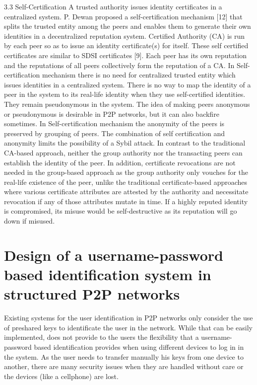  
3.3 Self-Certification
A trusted authority issues identity certificates in a
centralized system. P. Dewan proposed a self-certification
mechanism [12] that splits the trusted entity among the
peers and enables them to generate their own identities in a
decentralized reputation system. Certified Authority (CA)
is run by each peer so as to issue an identity certificate(s)
for itself. These self certified certificates are similar to
SDSI certificates [9]. Each peer has its own reputation and
the reputations of all peers collectively form the reputation
of a CA.
In Self-certification mechanism there is no need for
centralized trusted entity which issues identities in a
centralized system. There is no way to map the identity of
a peer in the system to its real-life identity when they use
self-certified identities. They remain pseudonymous in the
system. The idea of making peers anonymous or
pseudonymous is desirable in P2P networks, but it can also
backfire sometimes.
In Self-certification mechanism the anonymity of the peers
is preserved by grouping of peers. The combination of self
certification and anonymity limits the possibility of a Sybil
attack. In contrast to the traditional CA-based approach,
neither the group authority nor the transacting peers can
establish the identity of the peer. In addition, certificate
revocations are not needed in the group-based approach as
the group authority only vouches for the real-life existence
of the peer, unlike the traditional certificate-based
approaches where various certificate attributes are attested
by the authority and necessitate revocation if any of those
attributes mutate in time. If a highly reputed identity is
compromised, its misuse would be self-destructive as its
reputation will go down if misused.

\chapter{Design of a username-password based identification system in structured P2P networks}

Existing systems for the user identification in P2P networks only consider the
use of preshared keys to identificate the user in the network. While that can
be easily implemented, does not provide to the users the flexibility that a
username-password based identification provides when using different devices to
log in in the system. As the user needs to transfer manually his keys from one
device to another, there are many security issues when they are handled without
care or the devices (like a cellphone) are lost. 

